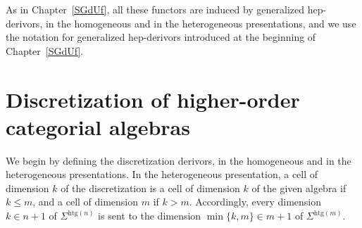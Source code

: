 \documentclass[a4paper, reqno]{amsbook}
\newcommand{\htg}{\mathrm{htg}}                %
\theoremstyle{plain}
\theoremstyle{definition}
\begin{document}
As in Chapter~\ref{SGdUf}, all these functors are induced by generalized hep-derivors, in the homogeneous and in the heterogeneous presentations, and we use the notation for generalized hep-derivors introduced at the beginning of Chapter~\ref{SGdUf}.

\section{Discretization of higher-order categorial algebras}\label{SDs}

We begin by defining the discretization derivors, in the homogeneous and in the heterogeneous presentations.
In the heterogeneous presentation, a cell of dimension $k$ of the discretization is a cell of dimension $k$ of the given algebra if $k\leq m$, and a cell of dimension $m$ if $k>m$.
Accordingly, every dimension $k\in n+1$ of $\Sigma^{\htg(n)}$ is sent to the dimension $\min\{k,m\}\in m+1$ of $\Sigma^{\htg(m)}$.
\end{document}
